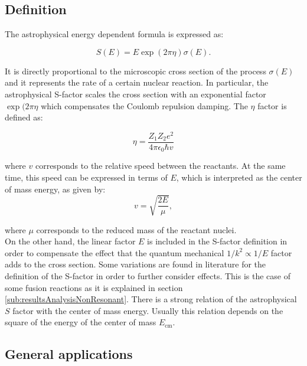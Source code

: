 \documentclass[openany]{book}
\begin{document}
\subsection{Definition} \label{sub:sfactorMotivationDefinition}

The astrophysical energy dependent formula is expressed as:

\begin{equation} \label{eq:sfactor_definition}
	S(E) = E \exp({2\pi\eta}) \sigma({E}).
\end{equation} 

It is directly proportional to the microscopic cross section of the process $\sigma(E)$ and it represents the rate of a certain nuclear reaction.  In particular, the astrophysical S-factor scales the cross section with an exponential factor $\exp({2\pi\eta}$ which compensates the Coulomb repulsion damping. The $\eta$ factor is defined as: 

\begin{equation} \label{eq:sfactor_sommerfeld}
	\eta = \frac{Z_1Z_2e^2}{4\pi\epsilon_0\hbar v}
\end{equation}

where $v$ corresponds to the relative speed between the reactants. At the same time, this speed can be expressed in terms of $E$, which is interpreted as the center of mass energy, as given by: \\

\begin{equation}\label{eq:sfactor_speed}
	v = \sqrt{\frac{2E}{\mu}},
\end{equation} 

where $\mu$ corresponds to the reduced mass of the reactant nuclei. \\

On the other hand, the linear factor $E$ is included in the S-factor definition in order to compensate the effect that the quantum mechanical $1/k^2 \propto 1/E$ factor adds to the cross section. Some variations are found in literature for the definition of the S-factor in order to further consider effects. This is the case of some fusion reactions as it is explained in section \ref{sub:resultsAnalysisNonResonant}. There is a strong relation of the astrophysical $S$ factor with the center of mass energy. Usually this relation depends on the square of the energy of the center of mass $E_{\mathrm{cm}}$. \\

\subsection{General applications} \label{sub:sfactorApplications}
\end{document}

